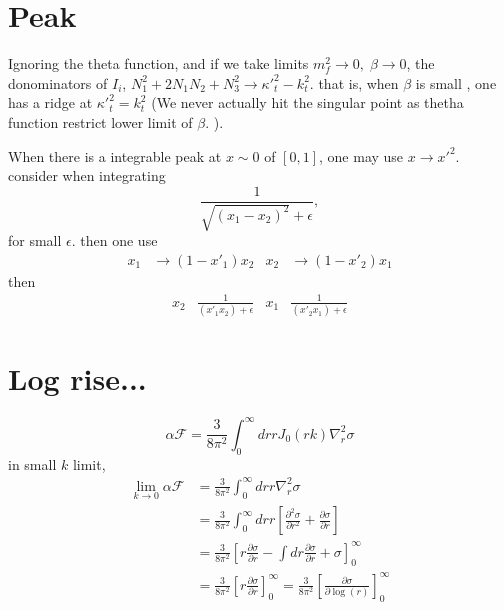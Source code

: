 \documentclass[12pt]{article}
\begin{document}
\section{Peak}
Ignoring the theta function, and if we take limits $m_f^2\rightarrow0,\;\beta\rightarrow0$, 
the donominators of $I_i$, $N_1^2+2N_1N_2+N_3^2\rightarrow {\kappa'}_t^2-k_t^2$.
that is, when $\beta$ is small , one has a ridge at ${\kappa'}_t^2=k_t^2$ (We never actually hit the singular point as thetha function restrict lower limit of $\beta$. ).

When there is a integrable peak at $x\sim0$ of $[0,1]$, one may use $x\rightarrow {x'}^2$. 
consider when integrating 
\begin{equation}
\frac{1}{\sqrt{(x_1-x_2)^2}+\epsilon},
\end{equation}
for small $\epsilon$.
 then one use
\begin{align}
x_1 &\rightarrow (1-{x'}_1) x_2& x_2 &\rightarrow (1-{x'}_2) x_1
\end{align}
then
\begin{align}
x_2&\frac{1}{ ({x'}_1 x_2)+\epsilon}& x_1&\frac{1}{({x'}_2 x_1)+\epsilon}
\end{align}



\section{Log rise...}
\begin{equation}
\alpha \mathcal{F} =\frac{3}{8\pi^2}\int^\infty_0dr r J_0(r k)\nabla^2_r \sigma
\end{equation}
in small $k$ limit,
\begin{equation}
\begin{split}
\lim_{k\rightarrow0 } \alpha \mathcal{F} &=\frac{3}{8\pi^2}\int^\infty_0dr r \nabla^2_r \sigma\\
&=\frac{3}{8\pi^2}\int^\infty_0dr r\left[\frac{\partial^2\sigma}{\partial r^2}+\frac{\partial\sigma}{\partial r}\right]\\
&=\frac{3}{8\pi^2}\left[r\frac{\partial\sigma}{\partial r}-\int dr \frac{\partial\sigma}{\partial r} +\sigma \right]^\infty_0\\
&=\frac{3}{8\pi^2}\left[r\frac{\partial\sigma}{\partial r}\right]^\infty_0=\frac{3}{8\pi^2}\left[\frac{\partial\sigma}{\partial \log(r)}\right]^\infty_0
\end{split}
\end{equation}
\end{document}
